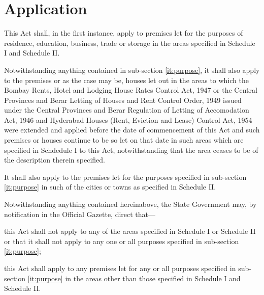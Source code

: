 \documentclass{mhact}
\begin{document}
\section{Application}
\begin{subsectionlist}
\item This Act shall, in the first instance, apply to premises let for
  the purposes of residence, education, business, trade or storage in
  the areas specified in Schedule I and Schedule II.
  \label{it:purpose}
\item Notwithstanding anything contained in sub-section
  \ref{it:purpose}, it shall
  also apply to the premises or as the case may be, houses let out in
  the areas to which the Bombay Rents, Hotel and Lodging House Rates
  Control Act, 1947  or the Central
  Provinces and Berar Letting of Houses and Rent Control Order, 1949
  issued under the Central Provinces and Berar Regulation of Letting
  of Accomodation Act, 1946 
  and Hyderabad Houses (Rent, Eviction and Lease) Control Act, 1954
   were extended and applied before
  the date of commencement of this Act and such premises or houses
  continue to be so let on that date in such areas which are specified
  in Schdedule I to this Act, notwithstanding that the area ceases to
  be of the description therein specified.

\item It shall also apply to the premises let for the purposes
  specified in sub-section \ref{it:purpose} in such of the cities or
  towns as specified in Schedule II.
\item Notwithstanding anything
  contained hereinabove, the State Government may, by notification in
  the Official Gazette, direct that---
  \begin{clause}
  \item this Act shall not apply to any of the areas specified in Schedule I or
    Schedule II or that it shall not apply to any one or all purposes specified in
    sub-section \ref{it:purpose};
  \item this Act shall apply to any premises let for any or all
    purposes specified in sub-section \ref{it:purpose} in the areas
    other than those specified in Schedule I and Schedule II.
  \end{clause} 

\end{subsectionlist}
\end{document}
